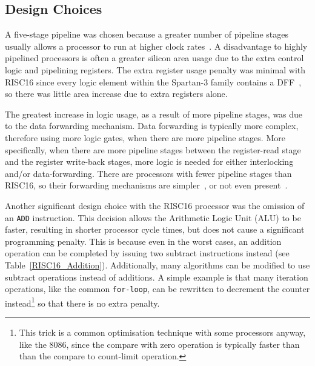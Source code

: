 \subsection{Design Choices}
A five-stage pipeline was chosen because a greater number of pipeline stages
usually allows a processor to run at higher clock rates~\cite{Comp_Arch,
parhami2005cam}. A disadvantage to highly pipelined processors is often a greater
silicon area usage due to the extra control logic and pipelining registers. The
extra register usage penalty was minimal with RISC16 since every logic element
within the Spartan-3 family contains a DFF~\cite{Xilinx_SP3_DS}, so there was
little area increase due to extra registers alone.

The greatest increase in logic usage, as a result of more pipeline stages, was
due to the data forwarding mechanism. Data forwarding is typically more complex,
therefore using more logic gates, when there are more pipeline stages. More
specifically, when there are more pipeline stages between the register-read stage
and the register write-back stages, more logic is needed for either interlocking
and/or data-forwarding. There are processors with fewer pipeline stages than
RISC16, so their forwarding mechanisms are simpler~\cite{ARM_Book}, or not even
present~\cite{FPGACPU}.

Another significant design choice with the RISC16 processor was the omission of
an \texttt{ADD} instruction. This decision allows the Arithmetic Logic
Unit (ALU) to be
faster, resulting in shorter processor cycle times, but does not cause a
significant programming penalty. This is because even in the worst cases, an
addition operation can be completed by issuing two subtract instructions instead
(see Table~\ref{RISC16_Addition}). Additionally, many algorithms can be modified
to use subtract operations instead of additions. A simple example is that many
iteration operations, like the common \texttt{for-loop}, can be rewritten to
decrement the counter instead\footnote{This trick is a common optimisation
technique with some processors anyway, like the 8086, since the compare with zero
operation is typically faster than than the compare to count-limit operation.} so
that there is no extra penalty.

